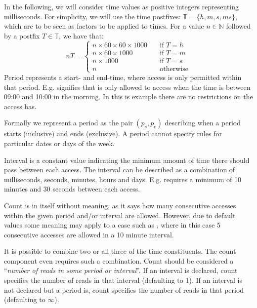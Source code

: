 In the following, we will consider time values as positive integers representing milliseconds.
For simplicity, we will use the time postfixes: $\mathbb{T} = \{ h, m, s, ms \}$, which are to be seen as factors to be applied to times.
For a value $n \in \mathbb{N}$ followed by a postfix $T \in \mathbb{T}$, we have that:
\[nT = \begin{cases}
  n \times 60 \times 60 \times 1000 & \quad\text{if } T = h \\
  n \times 60 \times 1000 & \quad\text{if } T = m \\
  n \times 1000 & \quad\text{if } T = s \\
  n & \quad\text{otherwise}
\end{cases}\]
Period represents a start- and end-time, where access is only permitted within that period.
E.g.  signifies that  is only allowed to access when the time is between 09:00 and 10:00 in the morning.
In this is example there are no restrictions on the access  has.

Formally we represent a period as the pair $(p_s, p_e)$ describing when a period starts (inclusive) and ends (exclusive).
A period cannot specify rules for particular dates or days of the week.

Interval is a constant value indicating the minimum amount of time there should pass between each access.
The interval can be described as a combination of milliseconds, seconds, minutes, hours and days.
E.g.  requires a minimum of 10 minutes and 30 seconds between each access.

Count is in itself without meaning, as it says how many consecutive accesses within the given period and/or interval are allowed.
However, due to default values some meaning may apply to a case such as , where in this case 5 consecutive accesses are allowed in a 10 minute interval.

It is possible to combine two or all three of the time constituents.
The count component even requires such a combination.
Count should be considered a ``\textit{number of reads in some period or interval}''.
If an interval is declared, count specifies the number of reads in that interval (defaulting to 1).
If an interval is not declared but a period is, count specifies the number of reads in that period (defaulting to $\infty$).

